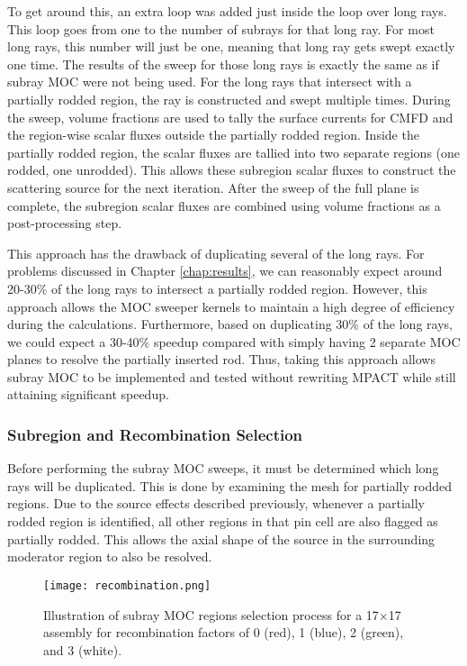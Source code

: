 To get around this, an extra loop was added just inside the loop over long rays.  This loop goes from one to the number of subrays for that long ray.  For most long rays, this number will just be one, meaning that long ray gets swept exactly one time.  The results of the sweep for those long rays is exactly the same as if subray MOC were not being used.  For the long rays that intersect with a partially rodded region, the ray is constructed and swept multiple times.  During the sweep, volume fractions are used to tally the surface currents for CMFD and the region-wise scalar fluxes outside the partially rodded region.  Inside the partially rodded region, the scalar fluxes are tallied into two separate regions (one rodded, one unrodded).  This allows these subregion scalar fluxes to construct the scattering source for the next iteration.  After the sweep of the full plane is complete, the subregion scalar fluxes are combined using volume fractions as a post-processing step.

This approach has the drawback of duplicating several of the long rays.  For problems discussed in Chapter \ref{chap:results}, we can reasonably expect around 20-30\% of the long rays to intersect a partially rodded region.  However, this approach allows the MOC sweeper kernels to maintain a high degree of efficiency during the calculations.  Furthermore, based on duplicating 30\% of the long rays, we could expect a 30-40\% speedup compared with simply having 2 separate MOC planes to resolve the partially inserted rod.  Thus, taking this approach allows subray MOC to be implemented and tested without rewriting MPACT while still attaining significant speedup.

\subsubsection{Subregion and Recombination Selection}\label{sss:recombination}

Before performing the subray MOC sweeps, it must be determined which long rays will be duplicated.  This is done by examining the mesh for partially rodded regions.  Due to the source effects described previously, whenever a partially rodded region is identified, all other regions in that pin cell are also flagged as partially rodded.  This allows the axial shape of the source in the surrounding moderator region to also be resolved.

\begin{figure}
    \centering
    \texttt{[image: recombination.png]}
    \caption{Illustration of subray MOC regions selection process for a 17$\times$17 assembly for recombination factors of 0 (red), 1 (blue), 2 (green), and 3 (white).}\label{f:recombination}
\end{figure}

